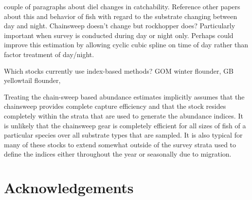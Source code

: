 \documentclass[]{article}
\begin{document}
couple of paragraphs about diel changes in catchability. Reference other
papers about this and behavior of fish with regard to the substrate
changing between day and night. Chainsweep doesn't change but rockhopper
does? Particularly important when survey is conducted during day or
night only. Perhaps could improve this estimation by allowing cyclic
cubic spline on time of day rather than factor treatment of day/night.

Which stocks currently use index-based methods? GOM winter flounder, GB
yellowtail flounder,

Treating the chain-sweep based abundance estimates implicitly assumes
that the chainsweep provides complete capture efficiency and that the
stock resides completely within the strata that are used to generate the
abundance indices. It is unlikely that the chainsweep gear is completely
efficient for all sizes of fish of a particular species over all
substrate types that are sampled. It is also typical for many of these
stocks to extend somewhat outside of the survey strata used to define
the indices either throughout the year or seasonally due to migration.

\hypertarget{acknowledgements}{%
\section*{Acknowledgements}\label{acknowledgements}}

\pagebreak



\hypertarget{refs}{}

\pagebreak
\end{document}
